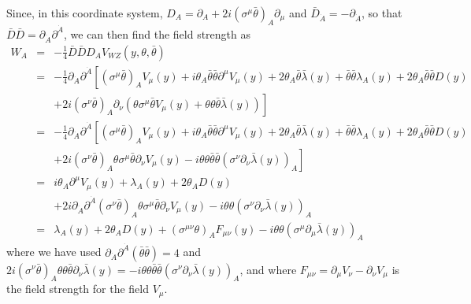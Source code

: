 \documentclass[notes.tex]{subfiles}
\begin{document}
\begin{Answer}
Since, in this coordinate system, $D_A=\partial_A+2i(\sigma^\mu\bar\theta)_A\partial_\mu$ and $\bar D_{\dot A}=-\partial_{\dot A}$, so that $\bar D \bar D=\partial_{\dot A}\partial^{\dot A}$, we can then find the field strength as
\begin{eqnarray}
W_A&=& -\frac{1}{4} \bar D \bar D D_A V_{WZ} (y, \theta, \bar{\theta}) \nonumber\\
&=& -\frac{1}{4}\partial_{\dot A}\partial^{\dot A} \left[
(\sigma^\mu\bar\theta)_AV_\mu(y)+ i\theta_A\bar\theta\bar\theta\partial^\mu V_\mu(y)  + 2\theta_A\bar\theta\bar\lambda(y) + \bar\theta\bar\theta\lambda_A(y) + 2\theta_A\bar\theta\bar\theta D(y) \right. \nonumber\\
&& \left. +2i(\sigma^\nu\bar\theta)_A\partial_\nu \left( \theta\sigma^\mu \bar\theta V_\mu(y) + \theta\theta\bar\theta\bar\lambda(y) \right)
\right] \nonumber\\
&=& -\frac{1}{4} \partial_{\dot A}\partial^{\dot A} \left[
(\sigma^\mu\bar\theta)_AV_\mu(y)+ i\theta_A\bar\theta\bar\theta\partial^\mu V_\mu(y)  + 2\theta_A\bar\theta\bar\lambda(y) + \bar\theta\bar\theta\lambda_A(y) + 2\theta_A\bar\theta\bar\theta D(y) \right. \nonumber\\
&& \left. +2i(\sigma^\nu\bar\theta)_A\theta\sigma^\mu \bar\theta \partial_\nu V_\mu(y) - i\theta\theta\bar\theta\bar\theta(\sigma^\nu\partial_\nu\bar\lambda(y))_A \right] \nonumber\\
&=& i\theta_A\partial^\mu V_\mu(y) +\lambda_A(y) + 2\theta_A D(y) \nonumber\\
&& +2i\partial_{\dot A}\partial^{\dot A}(\sigma^\nu\bar\theta)_A\theta\sigma^\mu \bar\theta \partial_\nu V_\mu(y) - i\theta\theta(\sigma^\nu\partial_\nu\bar\lambda(y))_A \nonumber\\
&=&\lambda_A(y) + 2\theta_A D(y)+(\sigma^{\mu\nu}\theta)_A F_{\mu\nu}(y) - i\theta\theta   (\sigma^\mu \partial_\mu \bar\lambda(y))_A
\end{eqnarray}
where we have used $\partial_{\dot A}\partial^{\dot A}(\bar\theta\bar\theta)=4$ and $2i(\sigma^\nu\bar\theta)_A\theta\theta\bar\theta\partial_\nu\bar\lambda(y)=-i\theta\theta\bar\theta\bar\theta(\sigma^\nu\partial_\nu\bar\lambda(y))_A$, and where $F_{\mu\nu}=\partial_\mu V_\nu-\partial_\nu V_\mu$ is the field strength for the field $V_\mu$.


\end{Answer}
\end{document}
